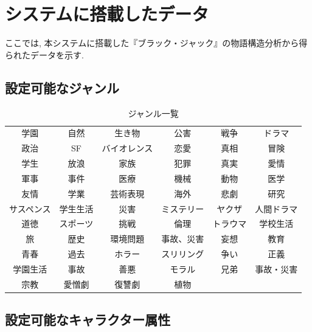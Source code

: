 \documentclass[a4j,12pt]{jsreport}
\begin{document}
\pagestyle{fancy}
\lhead{\rightmark}
\renewcommand{\chaptermark}[1]{\markboth{第\ \thechapter\ 章\ #1}{}}
\fi

\chapter{システムに搭載したデータ}\label{appendix:story_structure}
ここでは, 本システムに搭載した『ブラック・ジャック』の物語構造分析から得られたデータを示す.
\section{設定可能なジャンル}\label{appendix:genre_list}
\begin{table}[H]
   \centering
   \caption{ジャンル一覧}
   \label{genre_list}
   \begin{tabular}{cccccc}
      \hline
      学園 & 自然 & 生き物 & 公害 & 戦争 & ドラマ \\ 
      政治 & SF & バイオレンス & 恋愛 & 真相 & 冒険 \\ 
      学生 & 放浪 & 家族 & 犯罪 & 真実 & 愛情 \\ 
      軍事 & 事件 & 医療 & 機械 & 動物 & 医学 \\ 
      友情 & 学業 & 芸術表現 & 海外 & 悲劇 & 研究 \\ 
      サスペンス & 学生生活 & 災害 & ミステリー & ヤクザ & 人間ドラマ \\ 
      道徳 & スポーツ & 挑戦 & 倫理 & トラウマ & 学校生活 \\ 
      旅 & 歴史 & 環境問題 & 事故、災害 & 妄想 & 教育 \\ 
      青春 & 過去 & ホラー & スリリング & 争い & 正義 \\ 
      学園生活 & 事故 & 善悪 & モラル & 兄弟 & 事故・災害 \\ 
      宗教 & 愛憎劇 & 復讐劇 & 植物 &  &  \\
      \hline
   \end{tabular}
\end{table}

\newpage

\section{設定可能なキャラクター属性}\label{appendix:chara_attribute_list}
\end{document}
